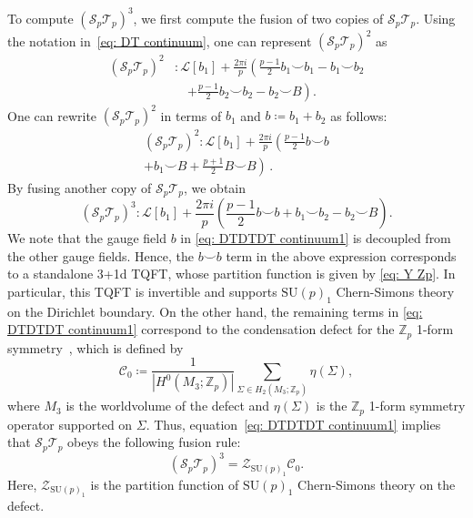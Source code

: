 \documentclass[aps,twocolumn,prx,floatfix,preprintnumbers, nofootinbib,10pt]{revtex4-2}
\numberwithin{equation}{section}
\theoremstyle{definition}
\theoremstyle{remark}
\theoremstyle{claim}
\begin{document}
To compute $(\mathcal{S}_p \mathcal{T}_p)^3$, we first compute the fusion of two copies of $\mathcal{S}_p\mathcal{T}_p$.
Using the notation in~\eqref{eq: DT continuum}, one can represent $(\mathcal{S}_p\mathcal{T}_p)^2$ as
\begin{equation}
\begin{aligned}
(\mathcal{S}_p \mathcal{T}_p)^2 &: \mathcal{L}[b_1] + \frac{2\pi i}{p} \left( \frac{p-1}{2} b_1 \smile b_1 - b_1 \smile b_2 \right. \\
& \quad \left. + \frac{p-1}{2} b_2 \smile b_2 - b_2 \smile B \right).
\end{aligned}
\end{equation}
One can rewrite $(\mathcal{S}_p\mathcal{T}_p)^2$ in terms of $b_1$ and $b \coloneq b_1+b_2$ as follows:
\begin{multline}
 (\mathcal{S}_p\mathcal{T}_p)^2: \mathcal{L}[b_1] + \frac{2\pi i}{p} \left( \frac{p-1}{2} b \smile b \right. \\
 \left. + b_1 \smile B + \frac{p+1}{2} B \smile B \right) \,.
\end{multline}
By fusing another copy of $\mathcal{S}_p\mathcal{T}_p$, we obtain
\begin{equation}
(\mathcal{S}_p\mathcal{T}_p)^3: \mathcal{L}[b_1] + \frac{2\pi i}{p} \left( \frac{p-1}{2} b {\smile} b + b_1 {\smile} b_2 - b_2 {\smile} B \right).
\label{eq: DTDTDT continuum1}
\end{equation}
We note that the gauge field $b$ in \eqref{eq: DTDTDT continuum1} is decoupled from the other gauge fields.
Hence, the $b \smile b$ term in the above expression corresponds to a standalone 3+1d TQFT, whose partition function is given by \eqref{eq: Y Zp}.
In particular, this TQFT is invertible and supports $\mathrm{SU}(p)_1$ Chern-Simons theory on the Dirichlet boundary.
On the other hand, the remaining terms in \eqref{eq: DTDTDT continuum1} correspond to the condensation defect for the $\mathbb{Z}_p$ 1-form symmetry~\cite{Choi:2022zal}, which is defined by \cite{Roumpedakis:2022aik, Choi:2022zal}
\begin{equation}
\mathcal{C}_0 \coloneq \frac{1}{|H^0(M_3; \mathbb{Z}_p)|} \sum_{\Sigma \in H_2(M_3; \mathbb{Z}_p)} \eta(\Sigma),
\end{equation}
where $M_3$ is the worldvolume of the defect and $\eta(\Sigma)$ is the $\mathbb{Z}_p$ 1-form symmetry operator supported on $\Sigma$.
Thus, equation~\eqref{eq: DTDTDT continuum1} implies that $\mathcal{S}_p\mathcal{T}_p$ obeys the following fusion rule:
\begin{equation}
(\mathcal{S}_p\mathcal{T}_p)^3 = \mathcal{Z}_{\mathrm{SU}(p)_1} \mathcal{C}_0.
\label{eq: DTDTDT continuum2}
\end{equation}
Here, $\mathcal{Z}_{\mathrm{SU}(p)_1}$ is the partition function of $\mathrm{SU}(p)_1$ Chern-Simons theory on the defect.
\end{document}
